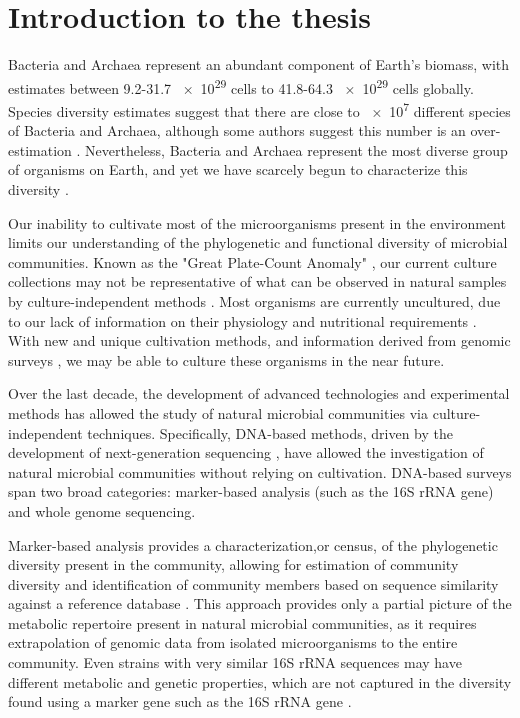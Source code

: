 
\chapter{Introduction to the thesis}

    Bacteria and Archaea represent an abundant component of Earth's biomass, with estimates between 9.2-31.7 \num{e29} cells \cite{Kallmeyer:2012km} to 41.8-64.3 \num{e29} cells \cite{Whitman:1998tj} globally. Species diversity estimates suggest that there are close to \num{e7} different species of Bacteria and Archaea\cite{Curtis:2002dj}, although some authors suggest this number is an over-estimation \cite{Schloss:2004do}. Nevertheless, Bacteria and Archaea represent the most diverse group of organisms on Earth, and yet we have scarcely begun to characterize this diversity \cite{Wu:2009ju, Rinke:2013bt}.

    Our inability to cultivate most of the microorganisms present in the environment limits our understanding of the phylogenetic and functional diversity of microbial communities. Known as the "Great Plate-Count Anomaly" \cite{Staley:1985ww}, our current culture collections may not be representative of what can be observed in natural samples by culture-independent methods \cite{Amann:1995tw}. Most organisms are currently uncultured, due to our lack of information on their physiology and nutritional requirements \cite{Stewart:2012dd}. With new and unique cultivation methods, and information derived from genomic surveys \cite{Tyson:2005by}, we may be able to culture these organisms in the near future.
    
   Over the last decade, the development of advanced technologies and experimental methods has allowed the study of natural microbial communities via culture-independent techniques. Specifically, DNA-based methods, driven by the development of next-generation sequencing \cite{Mardis:2008fr}, have allowed the investigation of natural microbial communities without relying on cultivation. DNA-based surveys span two broad categories: marker-based analysis (such as the 16S rRNA gene) and whole genome sequencing.
    
    Marker-based analysis provides a characterization,or census, of the phylogenetic diversity present in the community, allowing for estimation of community diversity\cite{Caporaso:2011cs, Rappe:2003fc, Caporaso:2010bi} and identification of community members based on sequence similarity against a reference database  \cite{McDonald:2011hn}. This approach provides only a partial picture of the metabolic repertoire present in natural microbial communities, as it requires extrapolation of genomic data from isolated microorganisms to the entire community. Even strains with very similar 16S rRNA sequences may have different metabolic and genetic properties, which are not captured in the diversity found using a marker gene such as the 16S rRNA gene \cite{Jaspers:2004ge}.
    
